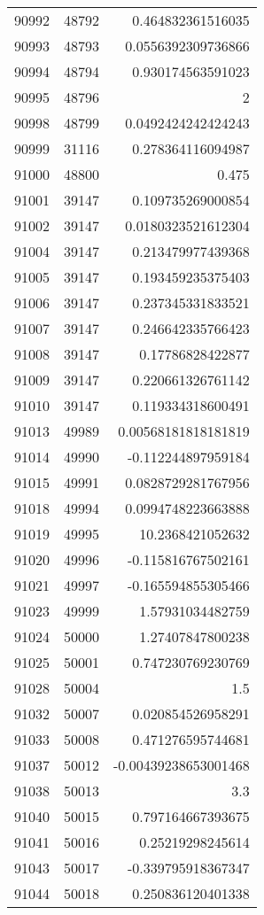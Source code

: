 \begin{tabular}{r | r | r}
90992 & 48792 & 0.464832361516035 \\
90993 & 48793 & 0.0556392309736866 \\
90994 & 48794 & 0.930174563591023 \\
90995 & 48796 & 2 \\
90998 & 48799 & 0.0492424242424243 \\
90999 & 31116 & 0.278364116094987 \\
91000 & 48800 & 0.475 \\
91001 & 39147 & 0.109735269000854 \\
91002 & 39147 & 0.0180323521612304 \\
91004 & 39147 & 0.213479977439368 \\
91005 & 39147 & 0.193459235375403 \\
91006 & 39147 & 0.237345331833521 \\
91007 & 39147 & 0.246642335766423 \\
91008 & 39147 & 0.17786828422877 \\
91009 & 39147 & 0.220661326761142 \\
91010 & 39147 & 0.119334318600491 \\
91013 & 49989 & 0.00568181818181819 \\
91014 & 49990 & -0.112244897959184 \\
91015 & 49991 & 0.0828729281767956 \\
91018 & 49994 & 0.0994748223663888 \\
91019 & 49995 & 10.2368421052632 \\
91020 & 49996 & -0.115816767502161 \\
91021 & 49997 & -0.165594855305466 \\
91023 & 49999 & 1.57931034482759 \\
91024 & 50000 & 1.27407847800238 \\
91025 & 50001 & 0.747230769230769 \\
91028 & 50004 & 1.5 \\
91032 & 50007 & 0.020854526958291 \\
91033 & 50008 & 0.471276595744681 \\
91037 & 50012 & -0.00439238653001468 \\
91038 & 50013 & 3.3 \\
91040 & 50015 & 0.797164667393675 \\
91041 & 50016 & 0.25219298245614 \\
91043 & 50017 & -0.339795918367347 \\
91044 & 50018 & 0.250836120401338 \\

\end{tabular}
